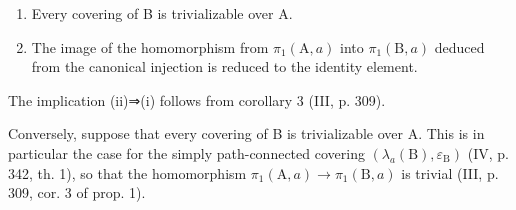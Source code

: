 \begin{enumerate}
\def\labelenumi{(\roman{enumi})}
\item
  Every covering of B is trivializable over A.
\item
  The image of the homomorphism from \(\pi_{1}(\mathrm{A},a)\) into \(\pi_{1}(\mathrm{B},a)\) deduced from the canonical injection is reduced to the identity element.
\end{enumerate}

The implication (ii)⇒(i) follows from corollary 3 (III, p. 309).

Conversely, suppose that every covering of B is trivializable over A. This is in particular the case for the simply path-connected covering \((\lambda_{a}(\mathrm{B}),\varepsilon_{\mathrm{B}})\) (IV, p. 342, th. 1), so that the homomorphism \(\pi_{1}(\mathrm{A},a)\to\pi_{1}(\mathrm{B},a)\) is trivial (III, p. 309, cor. 3 of prop. 1).

